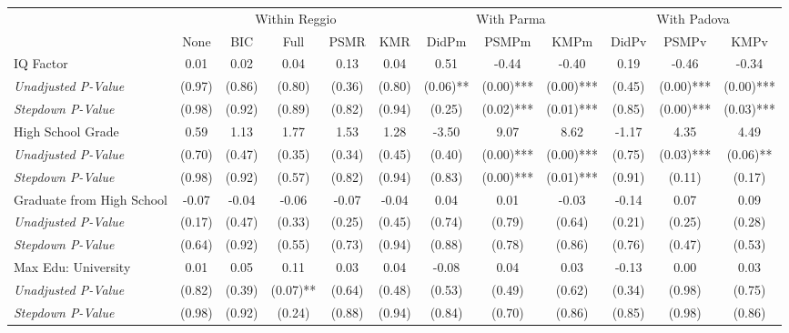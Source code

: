 \begin{tabular}{l c c c c c c c c c c c}
\toprule
& \multicolumn{5}{c}{Within Reggio} & \multicolumn{3}{c}{With Parma} & \multicolumn{3}{c}{With Padova} \\\cmidrule(lr){2-6} \cmidrule(lr){7-9} \cmidrule(lr){10-12}
 & None & BIC & Full & PSMR & KMR & DidPm & PSMPm & KMPm & DidPv & PSMPv & KMPv \\
\midrule
IQ Factor & 0.01 & 0.02 & 0.04 & 0.13 & 0.04 & 0.51 & -0.44 & -0.40 & 0.19 & -0.46 & -0.34 \\
\quad \textit{Unadjusted P-Value} & (0.97) & (0.86) & (0.80) & (0.36) & (0.80) & (0.06)** & (0.00)*** & (0.00)*** & (0.45) & (0.00)*** & (0.00)*** \\
\quad \textit{Stepdown P-Value} & (0.98) & (0.92) & (0.89) & (0.82) & (0.94) & (0.25) & (0.02)*** & (0.01)*** & (0.85) & (0.00)*** & (0.03)*** \\
High School Grade & 0.59 & 1.13 & 1.77 & 1.53 & 1.28 & -3.50 & 9.07 & 8.62 & -1.17 & 4.35 & 4.49 \\
\quad \textit{Unadjusted P-Value} & (0.70) & (0.47) & (0.35) & (0.34) & (0.45) & (0.40) & (0.00)*** & (0.00)*** & (0.75) & (0.03)*** & (0.06)** \\
\quad \textit{Stepdown P-Value} & (0.98) & (0.92) & (0.57) & (0.82) & (0.94) & (0.83) & (0.00)*** & (0.01)*** & (0.91) & (0.11) & (0.17) \\
Graduate from High School & -0.07 & -0.04 & -0.06 & -0.07 & -0.04 & 0.04 & 0.01 & -0.03 & -0.14 & 0.07 & 0.09 \\
\quad \textit{Unadjusted P-Value} & (0.17) & (0.47) & (0.33) & (0.25) & (0.45) & (0.74) & (0.79) & (0.64) & (0.21) & (0.25) & (0.28) \\
\quad \textit{Stepdown P-Value} & (0.64) & (0.92) & (0.55) & (0.73) & (0.94) & (0.88) & (0.78) & (0.86) & (0.76) & (0.47) & (0.53) \\
Max Edu: University & 0.01 & 0.05 & 0.11 & 0.03 & 0.04 & -0.08 & 0.04 & 0.03 & -0.13 & 0.00 & 0.03 \\
\quad \textit{Unadjusted P-Value} & (0.82) & (0.39) & (0.07)** & (0.64) & (0.48) & (0.53) & (0.49) & (0.62) & (0.34) & (0.98) & (0.75) \\
\quad \textit{Stepdown P-Value} & (0.98) & (0.92) & (0.24) & (0.88) & (0.94) & (0.84) & (0.70) & (0.86) & (0.85) & (0.98) & (0.86) \\
\bottomrule
\end{tabular}

